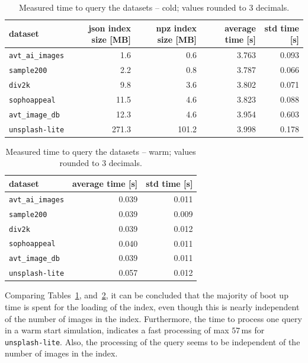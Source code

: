 \documentclass{article}
\begin{document}
\begin{table}[htb!]
\centering
\caption{Measured time to query the datasets -- cold; values rounded to 3 decimals.}
\label{tbl:measured_time_to_query_the_datasets_cold}
\begin{tabular}{lrrrr}
\toprule
dataset                  & json index size [MB] & npz index size [MB] & average time [s] & std time [s]  \\
\midrule
\texttt{avt\_ai\_images} & 1.6                  & 0.6                 & 3.763            & 0.093 \\
\texttt{sample200}       & 2.2                  & 0.8                 & 3.787            & 0.066 \\
\texttt{div2k}           & 9.8                  & 3.6                 & 3.802            & 0.071 \\
\texttt{sophoappeal}     & 11.5                 & 4.6                 & 3.823            & 0.088 \\
\texttt{avt\_image\_db}  & 12.3                 & 4.6                 & 3.954            & 0.603 \\
\texttt{unsplash-lite}   & 271.3                & 101.2               & 3.998            & 0.178 \\
\bottomrule
\end{tabular}
\end{table}

\begin{table}[htb!]
\centering
\caption{Measured time to query the datasets -- warm; values rounded to 3 decimals.}
\label{tbl:measured_time_to_query_the_datasets_warm}
\begin{tabular}{lrr}
\toprule
dataset                  & average time [s] & std time [s]  \\
\midrule
\texttt{avt\_ai\_images} & 0.039            & 0.011 \\
\texttt{sample200}       & 0.039            & 0.009 \\
\texttt{div2k}           & 0.039            & 0.012 \\
\texttt{sophoappeal}     & 0.040            & 0.011 \\
\texttt{avt\_image\_db}  & 0.039            & 0.011 \\
\texttt{unsplash-lite}   & 0.057            & 0.012 \\
\bottomrule
\end{tabular}
\end{table}


Comparing Tables~\ref{tbl:measured_time_to_query_the_datasets_cold}, and~\ref{tbl:measured_time_to_query_the_datasets_warm}, it can be concluded that the majority of boot up time is spent for the loading of the index, even though this is nearly independent of the number of images in the index.
Furthermore, the time to process one query in a warm start simulation, indicates a fast processing of max $57$\,ms for \texttt{unsplash-lite}.
Also, the processing of the query seems to be independent of the number of images in the index.
\end{document}
